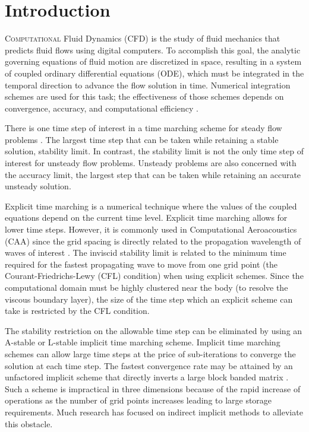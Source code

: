 \documentclass[conf]{new-aiaa}
\begin{document}
\section{Introduction}
\label{sec:Introdtion}
\lettrine{C}{omputational} Fluid Dynamics (CFD) is the study of fluid mechanics that predicts fluid flows using digital computers. 
To accomplish this goal, the analytic governing equations of fluid motion are discretized in space, resulting in a system of coupled ordinary differential equations (ODE), which must be integrated in the temporal direction to advance the flow solution in time. 
Numerical integration schemes are used for this task; the effectiveness of those schemes depends on convergence, accuracy, and computational efficiency \cite{Williamson}.

There is one time step of interest in a time marching scheme for steady flow problems \cite{Pulliamm}. 
The largest time step that can be taken while retaining a stable solution, stability limit.
In contrast, the stability limit is not the only time step of interest for unsteady flow problems. 
Unsteady problems are also concerned with the accuracy limit, the largest step that can be taken while retaining an accurate unsteady solution.

Explicit time marching is a numerical technique where the values of the coupled equations depend on the current time level. 
Explicit time marching allows for lower time steps. 
However, it is commonly used in Computational Aeroacoustics (CAA) since the grid spacing is directly related to the propagation wavelength of waves of interest \cite{YoonLUSGS}. 
The inviscid stability limit is related to the minimum time required for the fastest propagating wave to move from one grid point (the Courant-Friedrichs-Lewy (CFL) condition) when using explicit schemes. 
Since the computational domain must be highly clustered near the body (to resolve the viscous boundary layer), the size of the time step which an explicit scheme can take is restricted by the CFL condition.

The stability restriction on the allowable time step can be eliminated by using an A-stable or L-stable implicit time marching scheme.
Implicit time marching schemes can allow large time steps \cite{A_Stable} at the price of sub-iterations to converge the solution at each time step.
The fastest convergence rate may be attained by an unfactored implicit scheme that directly inverts a large block banded matrix \cite{HixonImplicit}. 
Such a scheme is impractical in three dimensions because of the rapid increase of operations as the number of grid points increases leading to large storage requirements. 
Much research has focused on indirect implicit methods to alleviate this obstacle.
\end{document}
